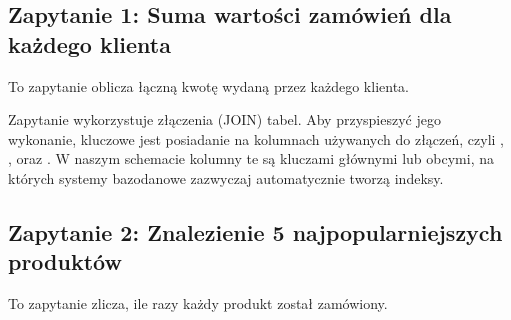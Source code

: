 \documentclass[a4paper,11pt,polish]{sphinxmanual}
\begin{document}
\subsection{Zapytanie 1: Suma wartości zamówień dla każdego klienta}
\label{\detokenize{rozdzial_4:zapytanie-1-suma-wartosci-zamowien-dla-kazdego-klienta}}
\sphinxAtStartPar
To zapytanie oblicza łączną kwotę wydaną przez każdego klienta.

\begin{sphinxVerbatim}[commandchars=\\\{\}]
\end{sphinxVerbatim}

\sphinxAtStartPar
{} Zapytanie wykorzystuje złączenia (JOIN) tabel. Aby przyspieszyć jego wykonanie, kluczowe jest posiadanie  na kolumnach używanych do złączeń, czyli , ,  oraz . W naszym schemacie kolumny te są kluczami głównymi lub obcymi, na których systemy bazodanowe zazwyczaj automatycznie tworzą indeksy.


\subsection{Zapytanie 2: Znalezienie 5 najpopularniejszych produktów}
\label{\detokenize{rozdzial_4:zapytanie-2-znalezienie-5-najpopularniejszych-produktow}}
\sphinxAtStartPar
To zapytanie zlicza, ile razy każdy produkt został zamówiony.
\end{document}

